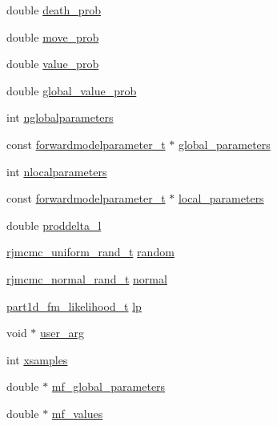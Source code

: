\begin{DoxyCompactItemize}
\item 
double \hyperlink{structpart1dfm_aadcbcceb1c0659ff7c3bf730b2ca1bc9}{death\+\_\+prob}
\item 
double \hyperlink{structpart1dfm_add9f0763156a60750d75a28483a53824}{move\+\_\+prob}
\item 
double \hyperlink{structpart1dfm_a341b09254f4518ddb868f8979ccae238}{value\+\_\+prob}
\item 
double \hyperlink{structpart1dfm_a22821f13056a872fa4eba975e55dd441}{global\+\_\+value\+\_\+prob}
\item 
int \hyperlink{structpart1dfm_ad84d22cd023a1c92efb40dbcbbfd03c9}{nglobalparameters}
\item 
const \hyperlink{forwardmodelparameter_8h_a18a7d2fd51fab097145725d83ac328e3}{forwardmodelparameter\+\_\+t} $\ast$ \hyperlink{structpart1dfm_a370fa519f6f7026f02b0d10e1323e865}{global\+\_\+parameters}
\item 
int \hyperlink{structpart1dfm_a3fccfef80cd67db9f4d22877918ea347}{nlocalparameters}
\item 
const \hyperlink{forwardmodelparameter_8h_a18a7d2fd51fab097145725d83ac328e3}{forwardmodelparameter\+\_\+t} $\ast$ \hyperlink{structpart1dfm_af12252cf6083f8193d4559e5c52dff94}{local\+\_\+parameters}
\item 
double \hyperlink{structpart1dfm_a4d304ab3156bf80a702193ce6dd87361}{proddelta\+\_\+l}
\item 
\hyperlink{rjmcmc__random_8h_accc36e83459ada552d8f70962190dac0}{rjmcmc\+\_\+uniform\+\_\+rand\+\_\+t} \hyperlink{structpart1dfm_a809000639489a661f35c6cd1151bb5e2}{random}
\item 
\hyperlink{rjmcmc__random_8h_a498625755d377b68ad37c9ab360e83b0}{rjmcmc\+\_\+normal\+\_\+rand\+\_\+t} \hyperlink{structpart1dfm_ad469a99c23e84b8a0bbdef538814c583}{normal}
\item 
\hyperlink{forwardmodel_8h_a55c6095922233bbf09da18c6f3735642}{part1d\+\_\+fm\+\_\+likelihood\+\_\+t} \hyperlink{structpart1dfm_a6ce4c88ae82b1dd307742d27ec27855e}{lp}
\item 
void $\ast$ \hyperlink{structpart1dfm_ab255e4bf81b324b1c1ace6a88921f05d}{user\+\_\+arg}
\item 
int \hyperlink{structpart1dfm_a87a222abfa06dce76a4e7aadf2695f46}{xsamples}
\item 
double $\ast$ \hyperlink{structpart1dfm_a783b431fe34721327a67300da93cdd07}{mf\+\_\+global\+\_\+parameters}
\item 
double $\ast$ \hyperlink{structpart1dfm_a0d02d19bc445e7edc2c9c8f189bc4fc7}{mf\+\_\+values}

\end{DoxyCompactItemize}
